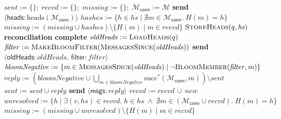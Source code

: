 \documentclass[a4paper,anonymous,USenglish]{lipics-v2019}
\begin{document}
\begin{algorithm}[p]
    \begin{algorithmic}[1]
        \State $\mathit{sent} := \{\};\; \mathit{recvd} := \{\};\; \mathit{missing} := \{\};\; \mathcal{M}_\mathsf{conn} := \mathcal{M}$ 
        \State \textbf{send} $\langle\mathsf{heads}: \mathrm{heads}(\mathcal{M}_\mathsf{conn})\rangle$
    \EndOn
    \State
     \label{line:recv-heads3}
        \State $hashes := \{h \in \mathit{hs} \mid \nexists m \in \mathcal{M}_\mathsf{conn}.\; H(m) = h\}$ 
        \State $\mathit{missing} := (\mathit{missing} \cup \mathit{hashes}) \setminus \{H(m) \mid m \in \mathit{recvd}\}$
         \label{line:missing-empty3}
             \State $\textsc{StoreHeads}(q, \mathit{hs})$
            \State \textbf{reconciliation complete} \label{line:finish3}
        \Else
             \State $\mathit{oldHeads} := \Call{LoadHeads}{q}$\label{line:load-heads3}
            \State $\mathit{filter} := \textsc{MakeBloomFilter}(\Call{MessagesSince}{\mathit{oldHeads}})$\label{line:make-bloom3}
            \State \textbf{send} $\langle \mathsf{oldHeads}: \mathit{oldHeads},\, \mathsf{filter}: \mathit{filter}\rangle$ \label{line:a2-send-heads3}
        \EndIf
    \EndOn\label{line:recv-heads-end3}
    \State
        \State $\mathit{bloomNegative} := \{m \in \Call{MessagesSince}{\mathit{oldHeads}} \mid \neg\Call{BloomMember}{\mathit{filter}, m}\}$\label{line:bloom-member3}
        \State $\mathit{reply} := \left(\mathit{bloomNegative} \cup \bigcup_{m \in \mathit{bloomNegative}} \mathrm{succ}^*(\mathcal{M}_\mathsf{conn}, m)\right) \setminus \mathit{sent}$\label{line:bloom-succ3}
        \State $\mathit{sent} := \mathit{sent} \cup \mathit{reply}$
        \State \textbf{send} $\langle\mathsf{msgs}: \mathit{reply}\rangle$
    \EndOn
    \State
     \label{line:recv-msgs3}
        \State $\mathit{recvd} := \mathit{recvd} \,\cup\, \mathit{new}$ \label{line:msgs-recvd3}
        \State $\mathit{unresolved} := \{h \mid \exists (v, \mathit{hs}) \in \mathit{recvd}.\; h \in \mathit{hs} \;\wedge\; \nexists m \in (\mathcal{M}_\mathsf{conn} \cup \mathit{recvd}).\; H(m) = h\}$ \label{line:msgs-missing3}
        \State $\mathit{missing} := (\mathit{missing} \cup \mathit{unresolved}) \setminus \{H(m) \mid m \in \mathit{recvd}\}$

\end{algorithmic}
\end{algorithm}
\end{document}
